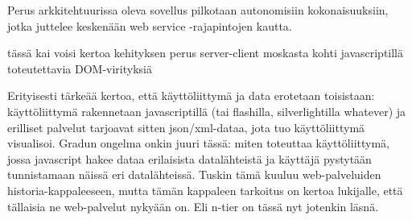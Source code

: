 Perus arkkitehtuurissa oleva sovellus pilkotaan autonomisiin kokonaisuuksiin, jotka juttelee keskenään web service -rajapintojen kautta.

tässä kai voisi kertoa kehityksen perus server-client moskasta kohti javascriptillä toteutettavia DOM-virityksiä

Erityisesti tärkeää kertoa, että käyttöliittymä ja data erotetaan toisistaan: käyttöliittymä rakennetaan javascriptillä (tai flashilla, silverlightilla whatever) ja erilliset palvelut tarjoavat sitten json/xml-dataa, jota tuo käyttöliittymä visualisoi. Gradun ongelma onkin juuri tässä: miten toteuttaa käyttöliittymä, jossa javascript hakee dataa erilaisista datalähteistä ja käyttäjä pystytään tunnistamaan näissä eri datalähteissä. Tuskin tämä kuuluu web-palveluiden historia-kappaleeseen, mutta tämän kappaleen tarkoitus on kertoa lukijalle, että tällaisia ne web-palvelut nykyään on. Eli n-tier on tässä nyt jotenkin läsnä.